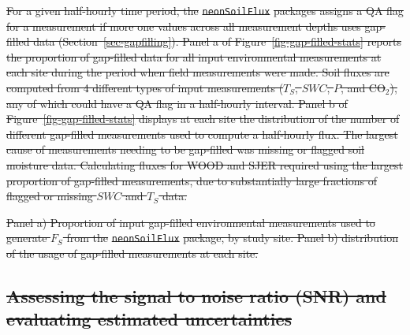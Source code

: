 \documentclass[
  letterpaper,
  DIV=11,
  numbers=noendperiod]{scrartcl}
\providecommand{\DIFdel}[1]{{\protect\color{red}\sout{#1}}}                      %
\providecommand{\DIFdelFL}[1]{\DIFdel{#1}} %
\begin{document}
\DIFdel{For a given half-hourly time period, the }\texttt{\DIFdel{neonSoilFlux}} %
\DIFdel{packages
assigns a QA flag for a measurement if more one values across all
measurement depths uses gap-filled data (Section~\ref{sec-gapfilling}).
Panel a of Figure~\ref{fig-gap-filled-stats} reports the proportion of
gap-filled data for all input environmental measurements at each site
during the period when field measurements were made. Soil fluxes are
computed from 4 different types of input measurements (\(T_{S}\),
\(SWC\), \(P\), and CO\(_{2}\)), any of which could have a QA flag in a
half-hourly interval. Panel b of Figure~\ref{fig-gap-filled-stats}
displays at each site the distribution of the number of different
gap-filled measurements used to compute a half-hourly flux. The largest
cause of measurements needing to be gap-filled was missing or flagged
soil moisture data. Calculating fluxes for WOOD and SJER required using
the largest proportion of gap-filled measurements, due to substantially
large fractions of flagged or missing \(SWC\) and \(T_{S}\) data.
}%





{%
\DIFdelFL{Panel a) Proportion of input
gap-filled environmental measurements used to generate \(F_{S}\) from
the }\texttt{\DIFdelFL{neonSoilFlux}} %
\DIFdelFL{package, by study site. Panel b) distribution
of the usage of gap-filled measurements at each site.}}


\subsection{\DIFdel{Assessing the signal to noise ratio (SNR) and evaluating
estimated
uncertainties}}%
\addtocounter{subsection}{-1}%
\end{document}
